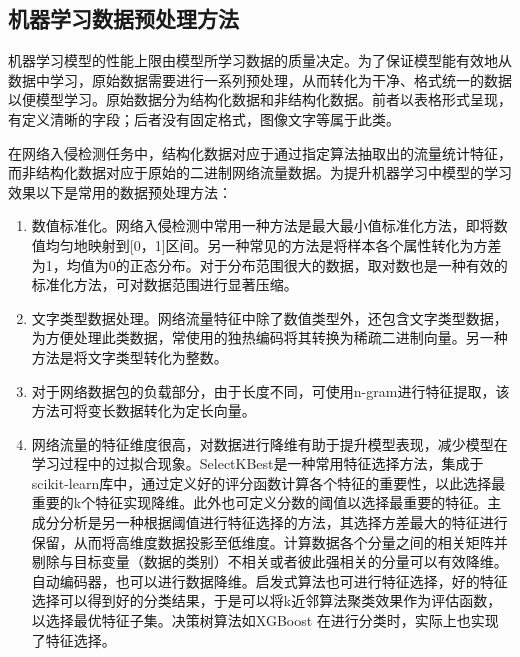 \subsection{机器学习数据预处理方法}
机器学习模型的性能上限由模型所学习数据的质量决定。为了保证模型能有效地从数据中学习，原始数据需要进行一系列预处理，从而转化为干净、格式统一的数据以便模型学习。原始数据分为结构化数据和非结构化数据。前者以表格形式呈现，有定义清晰的字段；后者没有固定格式，图像文字等属于此类。

在网络入侵检测任务中，结构化数据对应于通过指定算法抽取出的流量统计特征，而非结构化数据对应于原始的二进制网络流量数据。为提升机器学习中模型的学习效果以下是常用的数据预处理方法：
\begin{enumerate}
    \item 数值标准化。网络入侵检测中常用一种方法是最大最小值标准化方法，即将数值均匀地映射到[0，1]区间\cite{XAQY202212003,JSGG202206032,10.1016/j.csi.2023.103808,10.1080/21642583.2024.2321381,10.1109/ACCESS.2023.3251354}。另一种常见的方法是将样本各个属性转化为方差为1，均值为0的正态分布\cite{10.1016/j.ins.2021.03.060,10.1016/j.jksuci.2022.10.019}。对于分布范围很大的数据，取对数也是一种有效的标准化方法，可对数据范围进行显著压缩\cite{10.7717/peerj-cs.721}。
    
    \item 文字类型数据处理。网络流量特征中除了数值类型外，还包含文字类型数据，为方便处理此类数据，常使用的独热编码将其转换为稀疏二进制向量\cite{XAQY202212003,JSGG202206032,10.1016/j.csi.2023.103808,10.1016/j.measen.2022.100612,10.1016/j.knosys.2021.106798}。另一种方法是将文字类型转化为整数\cite{10.1016/j.simpat.2019.102031,10.1109/ICCSP48568.2020.9182099}。

    \item 对于网络数据包的负载部分，由于长度不同，可使用n-gram进行特征提取，该方法可将变长数据转化为定长向量\cite{10.1016/j.cose.2023.103171}。
    
    \item 网络流量的特征维度很高，对数据进行降维有助于提升模型表现，减少模型在学习过程中的过拟合现象。SelectKBest是一种常用特征选择方法，集成于scikit-learn库中，通过定义好的评分函数计算各个特征的重要性，以此选择最重要的k个特征实现降维\cite{10.1080/21642583.2024.2321381}。此外也可定义分数的阈值以选择最重要的特征\cite{10.1016/j.cose.2020.102062}。主成分分析是另一种根据阈值进行特征选择的方法，其选择方差最大的特征进行保留，从而将高维度数据投影至低维度\cite{10.1016/j.jksuci.2022.10.019}。计算数据各个分量之间的相关矩阵并剔除与目标变量（数据的类别）不相关或者彼此强相关的分量可以有效降维\cite{10.3390/math10030530}。自动编码器，也可以进行数据降维\cite{10.1016/j.knosys.2021.106798}。启发式算法也可进行特征选择，好的特征选择可以得到好的分类结果，于是可以将k近邻算法聚类效果作为评估函数，以选择最优特征子集\cite{10.1016/j.future.2020.07.042}。决策树算法如XGBoost 在进行分类时，实际上也实现了特征选择\cite{10.1016/j.comcom.2022.12.010,10.1016/j.icte.2020.03.002}。


\end{enumerate}
